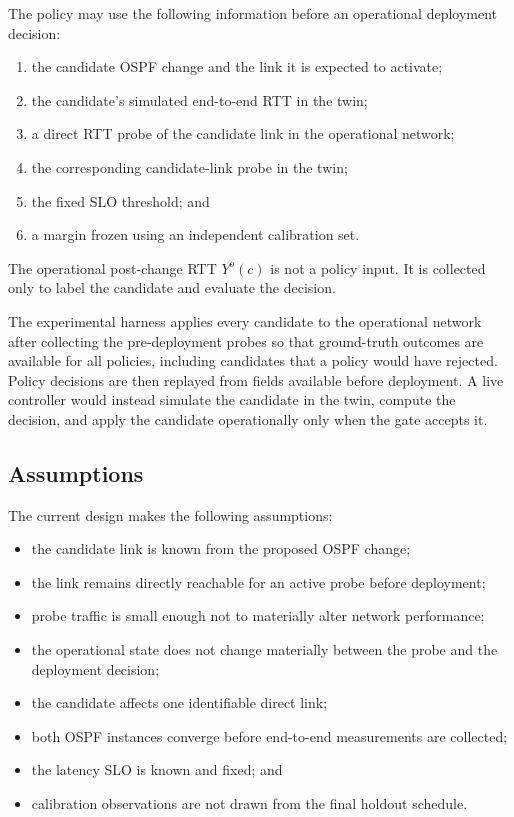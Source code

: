 The policy may use the following information before an operational deployment decision:
\begin{enumerate}
\item the candidate OSPF change and the link it is expected to activate;
\item the candidate's simulated end-to-end RTT in the twin;
\item a direct RTT probe of the candidate link in the operational network;
\item the corresponding candidate-link probe in the twin;
\item the fixed SLO threshold; and
\item a margin frozen using an independent calibration set.
\end{enumerate}

The operational post-change RTT $Y^o(c)$ is not a policy input. It is collected only to label the candidate and evaluate the decision.

The experimental harness applies every candidate to the operational network after collecting the pre-deployment probes so that ground-truth outcomes are available for all policies, including candidates that a policy would have rejected. Policy decisions are then replayed from fields available before deployment. A live controller would instead simulate the candidate in the twin, compute the decision, and apply the candidate operationally only when the gate accepts it.

\subsection{Assumptions}

The current design makes the following assumptions:
\begin{itemize}
\item the candidate link is known from the proposed OSPF change;
\item the link remains directly reachable for an active probe before deployment;
\item probe traffic is small enough not to materially alter network performance;
\item the operational state does not change materially between the probe and the deployment decision;
\item the candidate affects one identifiable direct link;
\item both OSPF instances converge before end-to-end measurements are collected;
\item the latency SLO is known and fixed; and
\item calibration observations are not drawn from the final holdout schedule.
\end{itemize}


